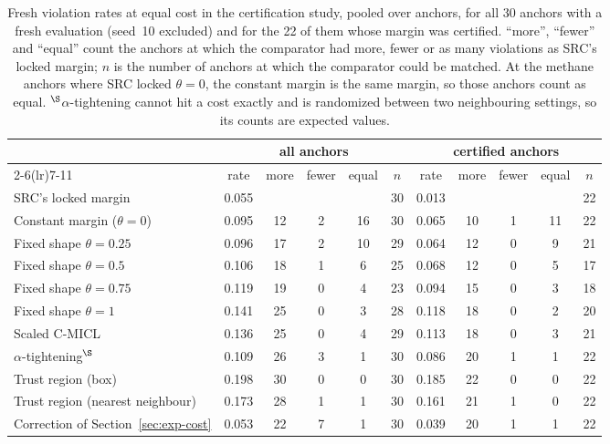 \begin{table}[t]
\centering
\scriptsize
\setlength{\tabcolsep}{3.5pt}
\caption{Fresh violation rates at equal cost in the certification study, pooled over
anchors, for all 30 anchors with a fresh evaluation (seed~10 excluded) and for the 22
of them whose margin was certified. ``more'', ``fewer'' and ``equal'' count the anchors
at which the comparator had more, fewer or as many violations as SRC's locked margin;
$n$ is the number of anchors at which the comparator could be matched. At the methane
anchors where SRC locked $\theta=0$, the constant margin is the same margin, so those
anchors count as equal. $^{\S}$$\alpha$-tightening cannot hit a cost exactly and is
randomized between two neighbouring settings, so its counts are expected values.}
\label{tab:cert-panel}
\begin{tabular}{l ccccc ccccc}
\toprule
 & \multicolumn{5}{c}{all anchors} & \multicolumn{5}{c}{certified anchors} \\
\cmidrule(lr){2-6}\cmidrule(lr){7-11}
 & rate & more & fewer & equal & $n$ & rate & more & fewer & equal & $n$ \\
\midrule
SRC's locked margin & 0.055 & & & & 30 & 0.013 & & & & 22 \\
\midrule
Constant margin ($\theta=0$) & 0.095 & 12 & 2 & 16 & 30 & 0.065 & 10 & 1 & 11 & 22 \\
Fixed shape $\theta=0.25$ & 0.096 & 17 & 2 & 10 & 29 & 0.064 & 12 & 0 & 9 & 21 \\
Fixed shape $\theta=0.5$ & 0.106 & 18 & 1 & 6 & 25 & 0.068 & 12 & 0 & 5 & 17 \\
Fixed shape $\theta=0.75$ & 0.119 & 19 & 0 & 4 & 23 & 0.094 & 15 & 0 & 3 & 18 \\
Fixed shape $\theta=1$ & 0.141 & 25 & 0 & 3 & 28 & 0.118 & 18 & 0 & 2 & 20 \\
Scaled C-MICL & 0.136 & 25 & 0 & 4 & 29 & 0.113 & 18 & 0 & 3 & 21 \\
$\alpha$-tightening$^{\S}$ & 0.109 & 26 & 3 & 1 & 30 & 0.086 & 20 & 1 & 1 & 22 \\
Trust region (box) & 0.198 & 30 & 0 & 0 & 30 & 0.185 & 22 & 0 & 0 & 22 \\
Trust region (nearest neighbour) & 0.173 & 28 & 1 & 1 & 30 & 0.161 & 21 & 1 & 0 & 22 \\
Correction of Section~\ref{sec:exp-cost} & 0.053 & 22 & 7 & 1 & 30 & 0.039 & 20 & 1 & 1 & 22 \\
\bottomrule
\end{tabular}
\end{table}
